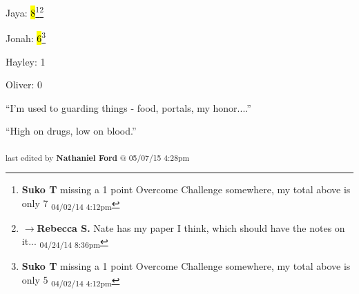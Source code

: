 
Jaya: \hl{8}\footnote{\textbf{Suko T }missing a 1 point Overcome Challenge somewhere, my total above is only 7 \textsubscript{04/02/14 4:12pm}}\footnote{$\rightarrow$\textbf{Rebecca S. }Nate has my paper I think, which should have the notes on it... \textsubscript{04/24/14 8:36pm}}

Jonah: \hl{6}\footnote{\textbf{Suko T }missing a 1 point Overcome Challenge somewhere, my total above is only 5 \textsubscript{04/02/14 4:12pm}}

Hayley: 1

Oliver: 0





``I'm used to guarding things -  food, portals, my honor....''




``High on drugs, low on blood.''




\vspace{\fill}

\begin{flushright}
\textsubscript{last edited by \textbf{Nathaniel Ford} @ 05/07/15 4:28pm}
\end{flushright}


